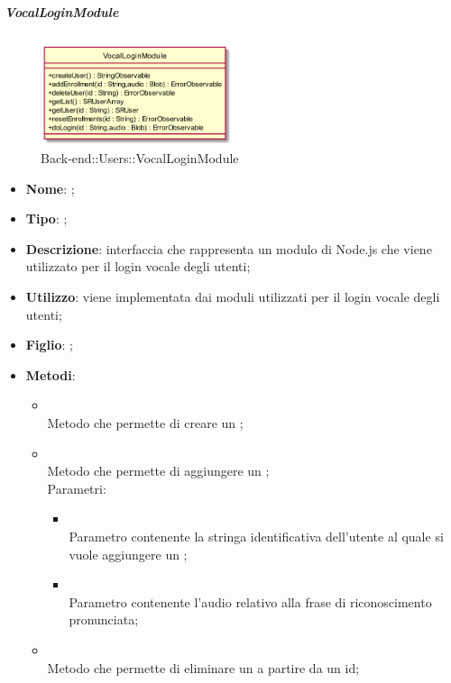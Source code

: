 \FloatBarrier

\hypertarget{VocalLoginModule_label}{\subparagraph{VocalLoginModule}}
\begin{figure}[h]
	\centering
	\includegraphics[width=0.50\textwidth,height=\textheight,keepaspectratio]{images/ClassVocalLoginModule.png}
	\caption{Back-end::Users::VocalLoginModule}
\end{figure}
\begin{itemize}
	\item \textbf{Nome}: ;
	\item \textbf{Tipo}: ;
	\item \textbf{Descrizione}: interfaccia che rappresenta un modulo di Node.js che viene utilizzato per il login vocale degli utenti;
	\item \textbf{Utilizzo}: viene implementata dai moduli utilizzati per il login vocale degli utenti;
	\item \textbf{Figlio}: ;
	\item \textbf{Metodi}:
	\begin{itemize}
		\item[]  \\		Metodo che permette di creare un ;\\
		\item[]  \\		Metodo che permette di aggiungere un ;\\
		Parametri:
		\begin{itemize}
			\item {} \\
			Parametro contenente la stringa identificativa dell'utente al quale si vuole aggiungere un ;
			\item {} \\
			Parametro contenente l'audio relativo alla frase di riconoscimento pronunciata;
		\end{itemize}
		\item[]  \\		Metodo che permette di eliminare un  a partire da un id;\\

\end{itemize}
\end{itemize}
